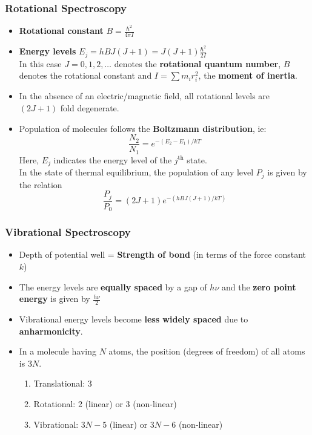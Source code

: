 \documentclass[a4paper]{article}
\begin{document}
\subsubsection{Rotational Spectroscopy}
\begin{itemize}
    \item \textbf{Rotational constant} $B = \frac{\hbar^2}{4\pi I}$ 
    \item \textbf{Energy levels} $E_j = hBJ(J+1) = J(J+1)\frac{\hbar^2}{2I}$\\
    In this case $J = 0,1,2,\dots$ denotes the \textbf{rotational quantum number}, $B$ denotes the rotational constant and $I = \sum m_ir_i^2$, the \textbf{moment of inertia}.
    \item In the absence of an electric/magnetic field, all rotational levels are $(2J+1)$ fold degenerate.
    \item Population of molecules follows the \textbf{Boltzmann distribution}, ie:
    \begin{equation*}
        \frac{N_2}{N_1} = e^{-(E_2-E_1)/kT}
    \end{equation*}
    Here, $E_j$ indicates the energy level of the $j^{\text{th}}$ state.\\
    In the state of thermal equilibrium, the population of any level $P_j$ is given by the relation
    \begin{equation*}
        \frac{P_j}{P_0} = (2J+1)e^{-(hBJ(J+1)/kT)}
    \end{equation*}
\end{itemize}

\subsubsection{Vibrational Spectroscopy}
\begin{itemize}
    \item Depth of potential well = \textbf{Strength of bond} (in terms of the force constant $k$)
    \item The energy levels are \textbf{equally spaced} by a gap of $h\nu$ and the \textbf{zero point energy} is given by $\frac{h\nu}{2}$
    \item Vibrational energy levels become \textbf{less widely spaced} due to \textbf{anharmonicity}.
    \item In a molecule having $N$ atoms, the position (degrees of freedom) of all atoms is $3N$.
    \begin{enumerate}
        \item Translational: 3
        \item Rotational: 2 (linear) or 3 (non-linear)
        \item Vibrational: $3N-5$ (linear) or $3N-6$ (non-linear)
    \end{enumerate}
\end{itemize}
\end{document}
